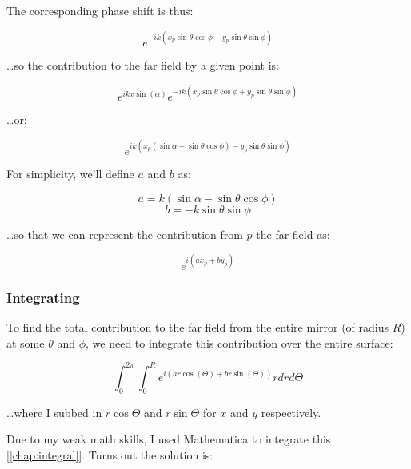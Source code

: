 \documentclass[etd,oneside,senior]{BYUPhys}
\begin{document}
The corresponding phase shift is thus:

\begin{equation}
  e^{-ik(x_p\sin{\theta}\cos{\phi}+y_p\sin{\theta}\sin{\phi})}
\end{equation}

\ldots so the contribution to the far field by a given point is:

\begin{equation}
  e^{ikx\sin\left({\alpha}\right)}e^{-ik(x_p\sin{\theta}\cos{\phi}+y_p\sin{\theta}\sin{\phi})}
\end{equation}

\ldots or:

\begin{equation}
  e^{ik\left(x_p(\sin{\alpha}-\sin{\theta}\cos{\phi})-y_p\sin{\theta}\sin{\phi}\right)}
\end{equation}

For simplicity, we'll define $a$ and $b$ as:

\begin{equation}
  a = k\left(\sin{\alpha}-\sin{\theta}\cos{\phi}\right)
\end{equation}
\begin{equation}
  b = -k\sin{\theta}\sin{\phi}
\end{equation}

\ldots so that we can represent the contribution from $p$ the far field as:

\begin{equation}
  e^{i(ax_p+by_p)}
\end{equation}

\subsubsection{Integrating}

To find the total contribution to the far field from the entire mirror (of radius $R$) at some $\theta$ and $\phi$, we need to integrate this contribution over the entire surface:

\begin{equation}\label{eq:integral1}
  \int_0^{2\pi}\int_0^R e^{i(ar\cos(\Theta)+br\sin(\Theta))} rdrd\Theta
\end{equation}

\ldots where I subbed in $r\cos\Theta$ and $r\sin\Theta$ for $x$ and $y$ respectively.

Due to my weak math skills, I used Mathematica to integrate this [\ref{chap:integral}]. Turns out the solution is:
\end{document}
